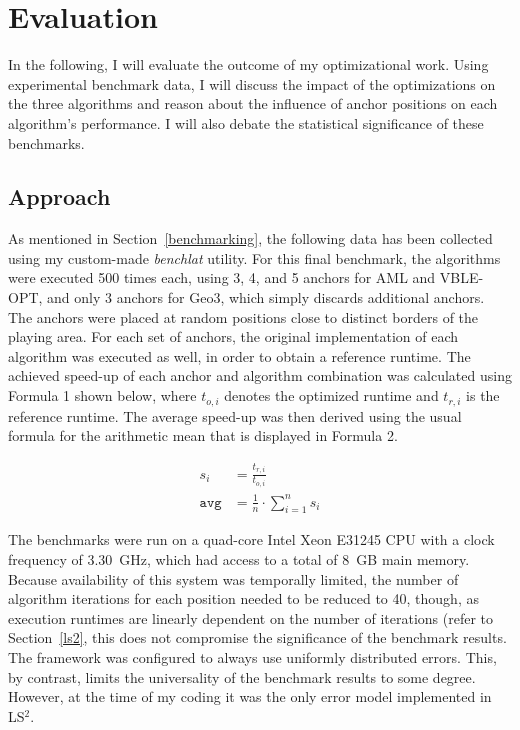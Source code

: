 \section{Evaluation}
\label{Evaluation}

In the following, I will evaluate the outcome of my optimizational work. Using experimental benchmark data, I will discuss the impact of the optimizations on the three algorithms and reason about the influence of anchor positions on each algorithm's performance. I will also debate the statistical significance of these benchmarks.

\subsection{Approach}
As mentioned in Section~\ref{benchmarking}, the following data has been collected using my custom-made \emph{benchlat} utility. For this final benchmark, the algorithms were executed 500 times each, using 3, 4, and 5 anchors for AML and VBLE-OPT, and only 3 anchors for Geo3, which simply discards additional anchors. The anchors were placed at random positions close to distinct borders of the playing area. For each set of anchors, the original implementation of each algorithm was executed as well, in order to obtain a reference runtime. The achieved speed-up of each anchor and algorithm combination was calculated using Formula 1 shown below, where $t_{o,i}$ denotes the optimized runtime and $t_{r,i}$ is the reference runtime. The average speed-up was then derived using the usual formula for the arithmetic mean that is displayed in Formula 2.

\begin{align}
s_{i}& = \frac{t_{r,i}}{t_{o,i}} \\
\texttt{avg}& = \frac{1}{n} \cdot \sum_{i = 1}^n s_{i}
\end{align}

The benchmarks were run on a quad-core Intel Xeon E31245 CPU with a clock frequency of 3.30~GHz, which had access to a total of 8~GB main memory. Because availability of this system was temporally limited, the number of algorithm iterations for each position needed to be reduced to 40, though, as execution runtimes are linearly dependent on the number of iterations (refer to Section~\ref{ls2}, this does not compromise the significance of the benchmark results. The framework was configured to always use uniformly distributed errors. This, by contrast, limits the universality of the benchmark results to some degree. However, at the time of my coding it was the only error model implemented in LS$^{2}$.

